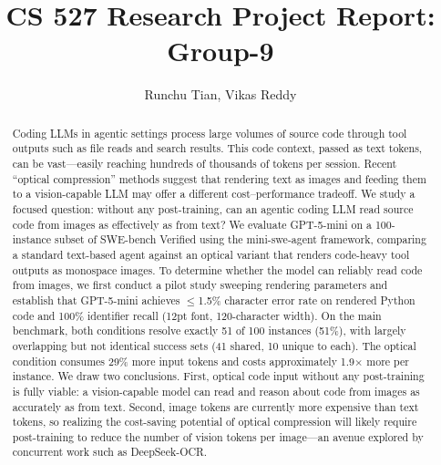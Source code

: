 \documentclass[sigconf,authorversion,nonacm]{acmart}
\begin{document}
\title{CS 527 Research Project Report: Group-9}

\author{Runchu Tian, Vikas Reddy}

\begin{abstract}
Coding LLMs in agentic settings process large volumes of source code through tool outputs such as file reads and search results. This code context, passed as text tokens, can be vast---easily reaching hundreds of thousands of tokens per session. Recent ``optical compression'' methods suggest that rendering text as images and feeding them to a vision-capable LLM may offer a different cost--performance tradeoff. We study a focused question: without any post-training, can an agentic coding LLM read source code from images as effectively as from text? We evaluate GPT-5-mini on a 100-instance subset of SWE-bench Verified using the mini-swe-agent framework, comparing a standard text-based agent against an optical variant that renders code-heavy tool outputs as monospace images. To determine whether the model can reliably read code from images, we first conduct a pilot study sweeping rendering parameters and establish that GPT-5-mini achieves $\le$1.5\% character error rate on rendered Python code and 100\% identifier recall (12pt font, 120-character width). On the main benchmark, both conditions resolve exactly 51 of 100 instances (51\%), with largely overlapping but not identical success sets (41 shared, 10 unique to each). The optical condition consumes 29\% more input tokens and costs approximately 1.9$\times$ more per instance. We draw two conclusions. First, optical code input without any post-training is fully viable: a vision-capable model can read and reason about code from images as accurately as from text. Second, image tokens are currently more expensive than text tokens, so realizing the cost-saving potential of optical compression will likely require post-training to reduce the number of vision tokens per image---an avenue explored by concurrent work such as DeepSeek-OCR.
\end{abstract}

\maketitle








\end{document}
